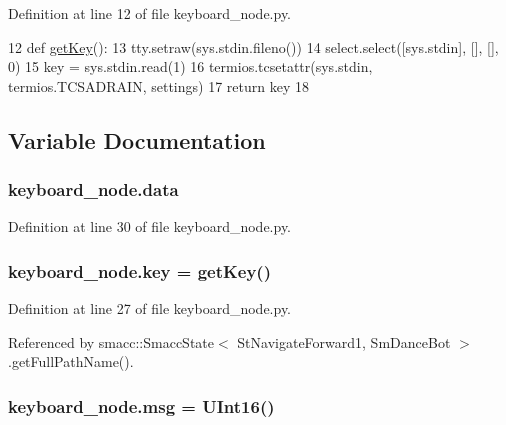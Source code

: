 Definition at line 12 of file keyboard\+\_\+node.\+py.


\begin{DoxyCode}
12 \textcolor{keyword}{def }\hyperlink{namespacekeyboard__node_a14d63e075186fe8cedf60ed3524811f5}{getKey}():
13     tty.setraw(sys.stdin.fileno())
14     select.select([sys.stdin], [], [], 0)
15     key = sys.stdin.read(1)
16     termios.tcsetattr(sys.stdin, termios.TCSADRAIN, settings)
17     \textcolor{keywordflow}{return} key
18 
\end{DoxyCode}


\subsection{Variable Documentation}
\subsubsection[{\texorpdfstring{data}{data}}]{\setlength{\rightskip}{0pt plus 5cm}keyboard\+\_\+node.\+data}\hypertarget{namespacekeyboard__node_a33f8346a3ffb7a9fef12da96e958f14e}{}\label{namespacekeyboard__node_a33f8346a3ffb7a9fef12da96e958f14e}


Definition at line 30 of file keyboard\+\_\+node.\+py.

\subsubsection[{\texorpdfstring{key}{key}}]{\setlength{\rightskip}{0pt plus 5cm}keyboard\+\_\+node.\+key = {\bf get\+Key}()}\hypertarget{namespacekeyboard__node_aec12217d2be0bbc768f52b63b0673925}{}\label{namespacekeyboard__node_aec12217d2be0bbc768f52b63b0673925}


Definition at line 27 of file keyboard\+\_\+node.\+py.



Referenced by smacc\+::\+Smacc\+State$<$ St\+Navigate\+Forward1, Sm\+Dance\+Bot $>$.\+get\+Full\+Path\+Name().

\subsubsection[{\texorpdfstring{msg}{msg}}]{\setlength{\rightskip}{0pt plus 5cm}keyboard\+\_\+node.\+msg = U\+Int16()}\hypertarget{namespacekeyboard__node_a768777e12f75b89e4a0a60acf748e9eb}{}\label{namespacekeyboard__node_a768777e12f75b89e4a0a60acf748e9eb}


